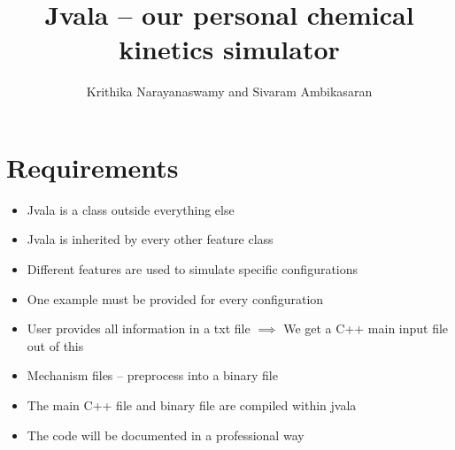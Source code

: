 \documentclass[10pt]{article} %
\title{Jvala -- our personal chemical kinetics simulator}
\author{Krithika Narayanaswamy and Sivaram Ambikasaran}
\begin{document}
\maketitle

\section{Requirements}
\begin{itemize}
	\item Jvala is a class outside everything else
	\item Jvala is inherited by every other feature class
	\item Different features are used to simulate specific configurations
	\item One example must be provided for every configuration
	\item User provides all information in a txt file $\implies$ We get a C++ main input file out of this 
	\item Mechanism files -- preprocess into a binary file
	\item The main C++ file and binary file are compiled within jvala
	\item The code will be documented in a professional way
\end{itemize}
\end{document}
